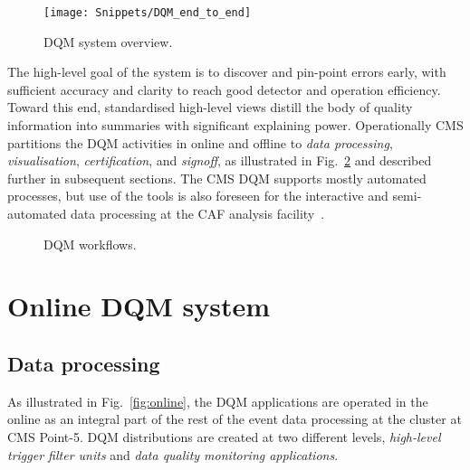 \documentclass[a4paper]{jpconf}
\begin{document}
\begin{figure}[!b]
\begin{center}
\texttt{[image: Snippets/DQM\_end\_to\_end]}
\end{center}
\caption{\label{fig:overview}DQM system overview.}
\end{figure}

The high-level goal of the system is to discover and pin-point errors early,
with sufficient accuracy and clarity to reach good detector and operation
efficiency.  Toward this end, standardised high-level views distill the body
of quality information into summaries with significant explaining power.
Operationally CMS partitions the DQM activities in online and offline to {\em
  data processing}, {\em visualisation}, {\em certification}, and {\em
  signoff}, as illustrated in Fig.~\ref{fig:systems} and described further in
subsequent sections.  The CMS DQM supports mostly automated processes, but use
of the tools is also foreseen for the interactive and semi-automated data
processing at the CAF analysis facility~\cite{caf}.

\begin{figure}[!b]
\begin{center}
\hspace{1in}
\caption{\label{fig:systems}DQM workflows.}
\end{center}
\end{figure}


\section{Online DQM system}
\subsection{Data processing}

As illustrated in Fig.~\ref{fig:online}, the DQM applications are operated in
the online as an integral part of the rest of the event data processing at the
cluster at CMS Point-5.  DQM distributions are created at two different
levels, {\em high-level trigger filter units} and {\em data quality monitoring
  applications}.
\end{document}
